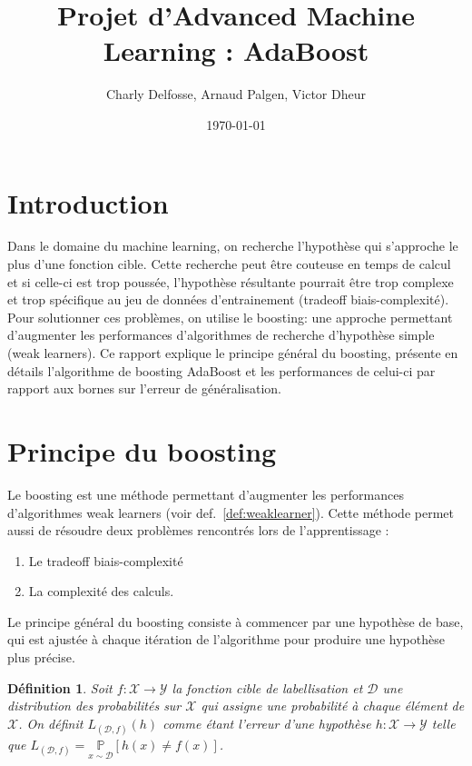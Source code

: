 \documentclass[12pt]{article}
\title{Projet d'Advanced Machine Learning : AdaBoost}
\date{\today}
\author{Charly Delfosse, Arnaud Palgen, Victor Dheur}
\newtheorem{definition}{Définition}
\begin{document}
	\maketitle
	
	\section*{Introduction}
	
	Dans le domaine du machine learning, on recherche l'hypothèse qui s'approche le plus d'une fonction
	cible. Cette recherche peut être couteuse en temps de calcul et si celle-ci est trop poussée, 
	l'hypothèse résultante pourrait être trop complexe et trop spécifique au jeu de données
	d'entrainement (tradeoff biais-complexité). Pour solutionner ces problèmes, on utilise le 
	boosting: une approche permettant d'augmenter les performances d'algorithmes de recherche 
	d'hypothèse simple (weak learners). Ce rapport explique le principe général du boosting,
	présente en détails l'algorithme de boosting AdaBoost et
	les performances de celui-ci par rapport aux bornes sur l'erreur de généralisation.
	
	\section{Principe du boosting}
	
	Le boosting est une méthode permettant d'augmenter les performances\\ d'algorithmes weak learners
	(voir def.~\ref{def:weaklearner}). Cette méthode permet aussi de résoudre deux problèmes
	rencontrés lors de l'apprentissage :
	\begin{enumerate}
		\item Le tradeoff biais-complexité
		\item La complexité des calculs.
	\end{enumerate}
	
	Le principe général du boosting consiste à commencer par une hypothèse de base,
	qui est ajustée à chaque itération de l'algorithme pour produire une hypothèse plus précise.
	
	\begin{definition}
	Soit $f: \mathcal{X} \rightarrow \mathcal{Y}$ la fonction cible de labellisation et $\mathcal{D}$
	une distribution des probabilités sur $\mathcal{X}$ qui assigne une probabilité à chaque élément
	de $\mathcal{X}$. On définit $L_{(\mathcal{D},f)}(h)$ comme étant l'erreur d'une hypothèse
	$h: \mathcal{X} \rightarrow \mathcal{Y}$ telle que
	$L_{(\mathcal{D},f)} = \underset{x \sim \mathcal{D}}{\mathbb{P}} [h(x) \neq f(x)]$.
	\end{definition}	
	
\end{document}
